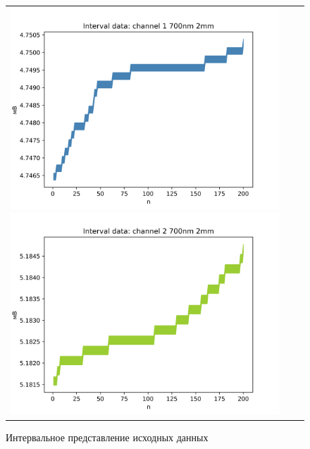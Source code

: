 \begin{figure}[H]
	\begin{tabular}{ccc}
		\includegraphics[scale=0.5]{resources/intervals_PR1.png}
		\includegraphics[scale=0.5]{resources/intervals_PR2.png}
	\end{tabular} \label{pic:intervals}
	\caption{Интервальное представление исходных данных} 
\end{figure}

